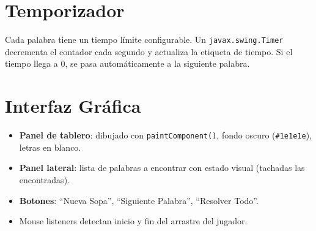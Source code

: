 \documentclass[12pt,a4paper]{article}
\begin{document}
\section{Temporizador}

Cada palabra tiene un tiempo límite configurable. Un \texttt{javax.swing.Timer} decrementa el contador cada segundo y actualiza la etiqueta de tiempo. Si el tiempo llega a 0, se pasa automáticamente a la siguiente palabra.

\section{Interfaz Gráfica}

\begin{itemize}
  \item \textbf{Panel de tablero}: dibujado con \texttt{paintComponent()}, fondo oscuro (\texttt{\#1e1e1e}), letras en blanco.
  \item \textbf{Panel lateral}: lista de palabras a encontrar con estado visual (tachadas las encontradas).
  \item \textbf{Botones}: ``Nueva Sopa'', ``Siguiente Palabra'', ``Resolver Todo''.
  \item Mouse listeners detectan inicio y fin del arrastre del jugador.
\end{itemize}
\end{document}

